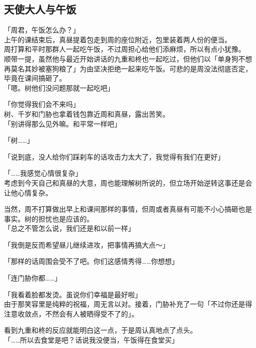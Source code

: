 \subsection{天使大人与午饭}

「周君，午饭怎么办？」\\

上午的课结束后，真昼提着包走到周的座位附近，包里装着两人份的便当。\\

周打算和平时那群人一起吃午饭，不过周担心给他们添麻烦，所以有点小犹豫。\\

顺带一提，虽然他与最近开始讲话的九重和柊也一起吃过，但他们以「单身狗不想再莫名其妙被塞狗粮了」为由坚决拒绝一起来吃午饭。可悲的是周没法彻底否定，毕竟在课间搞砸了。\\

「嗯。树他们没问题那就一起吃吧」

「你觉得我们会不来吗」\\

树、千岁和门胁也拿着钱包靠近周和真昼，露出苦笑。\\

「别讲得那么见外嘛。和平常一样吧」

「树……」

「说到底，没人给你们踩刹车的话攻击力太大了，我觉得有我们在更好」

「……我感觉心情很复杂」\\

考虑到今天自己和真昼的大意，周也能理解树所说的，但立场开始逆转这事还是会让他心情复杂。

当然，周不打算做出早上和课间那样的事情，但周或者真昼有可能不小心搞砸也是事实。树的担忧也是应该的。\\

「总之不管怎么说，我们还是和以前一样」

「我倒是反而希望昼儿继续进攻，把事情再搞大点～」

「那样的话周围会受不了吧。你们这感情秀得……你想想」

「连门胁你都……」

「我看着脸都发烫。虽说你们幸福是最好啦」\\

由于那笑容里是纯粹的祝福，周无言以对。接着，门胁补充了一句「不过你还是得注意收敛点，不然会有人被晒得受不了的」。

看到九重和柊的反应就能明白这一点，于是周认真地点了点头。\\

「……所以去食堂是吧？话说我没便当，午饭得在食堂买」

